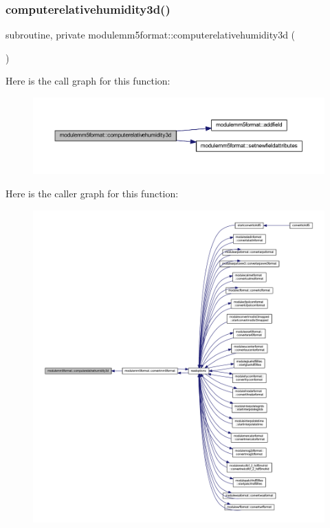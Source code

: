 \subsubsection{\texorpdfstring{computerelativehumidity3d()}{computerelativehumidity3d()}}
{\footnotesize\ttfamily subroutine, private modulemm5format\+::computerelativehumidity3d (\begin{DoxyParamCaption}{ }\end{DoxyParamCaption})\hspace{0.3cm}{\ttfamily [private]}}

Here is the call graph for this function\+:\nopagebreak
\begin{figure}[H]
\begin{center}
\leavevmode
\includegraphics[width=350pt]{namespacemodulemm5format_a6beb646cd455e39599d5f9f360390986_cgraph}
\end{center}
\end{figure}
Here is the caller graph for this function\+:\nopagebreak
\begin{figure}[H]
\begin{center}
\leavevmode
\includegraphics[width=350pt]{namespacemodulemm5format_a6beb646cd455e39599d5f9f360390986_icgraph}
\end{center}
\end{figure}
\mbox{\label{namespacemodulemm5format_a904f7716ce2118cfd1236ab57b46a0f3}} 

